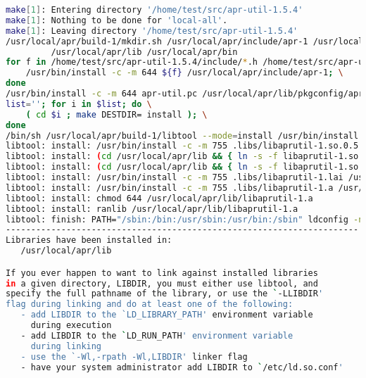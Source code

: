 \begin{lstlisting}[language=bash]
make[1]: Entering directory '/home/test/src/apr-util-1.5.4'
make[1]: Nothing to be done for 'local-all'.
make[1]: Leaving directory '/home/test/src/apr-util-1.5.4'
/usr/local/apr/build-1/mkdir.sh /usr/local/apr/include/apr-1 /usr/local/apr/lib/pkgconfig \
	     /usr/local/apr/lib /usr/local/apr/bin
for f in /home/test/src/apr-util-1.5.4/include/*.h /home/test/src/apr-util-1.5.4/include/*.h; do \
	/usr/bin/install -c -m 644 ${f} /usr/local/apr/include/apr-1; \
done
/usr/bin/install -c -m 644 apr-util.pc /usr/local/apr/lib/pkgconfig/apr-util-1.pc
list=''; for i in $list; do \
	( cd $i ; make DESTDIR= install ); \
done
/bin/sh /usr/local/apr/build-1/libtool --mode=install /usr/bin/install -c -m 755 libaprutil-1.la /usr/local/apr/lib
libtool: install: /usr/bin/install -c -m 755 .libs/libaprutil-1.so.0.5.4 /usr/local/apr/lib/libaprutil-1.so.0.5.4
libtool: install: (cd /usr/local/apr/lib && { ln -s -f libaprutil-1.so.0.5.4 libaprutil-1.so.0 || { rm -f libaprutil-1.so.0 && ln -s libaprutil-1.so.0.5.4 libaprutil-1.so.0; }; })
libtool: install: (cd /usr/local/apr/lib && { ln -s -f libaprutil-1.so.0.5.4 libaprutil-1.so || { rm -f libaprutil-1.so && ln -s libaprutil-1.so.0.5.4 libaprutil-1.so; }; })
libtool: install: /usr/bin/install -c -m 755 .libs/libaprutil-1.lai /usr/local/apr/lib/libaprutil-1.la
libtool: install: /usr/bin/install -c -m 755 .libs/libaprutil-1.a /usr/local/apr/lib/libaprutil-1.a
libtool: install: chmod 644 /usr/local/apr/lib/libaprutil-1.a
libtool: install: ranlib /usr/local/apr/lib/libaprutil-1.a
libtool: finish: PATH="/sbin:/bin:/usr/sbin:/usr/bin:/sbin" ldconfig -n /usr/local/apr/lib
----------------------------------------------------------------------
Libraries have been installed in:
   /usr/local/apr/lib

If you ever happen to want to link against installed libraries
in a given directory, LIBDIR, you must either use libtool, and
specify the full pathname of the library, or use the `-LLIBDIR'
flag during linking and do at least one of the following:
   - add LIBDIR to the `LD_LIBRARY_PATH' environment variable
     during execution
   - add LIBDIR to the `LD_RUN_PATH' environment variable
     during linking
   - use the `-Wl,-rpath -Wl,LIBDIR' linker flag
   - have your system administrator add LIBDIR to `/etc/ld.so.conf'


\end{lstlisting}
